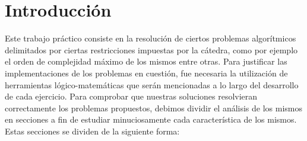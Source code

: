 \documentclass[10pt, a4paper]{article}
\author{Algoritmos y Estructuras de Datos III, DC, UBA.}
\date{}
\title{}
\begin{document}
	
\thispagestyle{empty}
\titulo{}

\maketitle

\tableofcontents
\newpage

\section{Introducci\'on}
Este trabajo práctico consiste en la resolución de ciertos problemas algorítmicos delimitados por ciertas restricciones impuestas por la cátedra, como por ejemplo el orden de complejidad máximo de los mismos entre otras. Para justificar las implementaciones de los problemas en cuestión, fue necesaria la utilización de herramientas lógico-matemáticas que serán mencionadas a lo largo del desarrollo de cada ejercicio.\newline
Para comprobar que nuestras soluciones resolvieran correctamente los problemas propuestos, debimos dividir el análisis de los mismos en secciones a fin de estudiar minuciosamente cada característica de los mismos. Estas secciones se dividen de la siguiente forma:\newline
\end{document}
